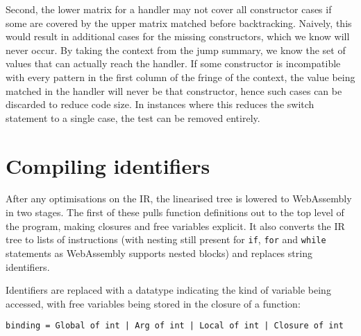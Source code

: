 Second, the lower matrix for a handler may not cover all constructor cases if some are covered by the upper matrix matched before backtracking. Naively, this would result in additional cases for the missing constructors, which we know will never occur. 
By taking the context from the jump summary, we know the set of values that can actually reach the handler. If some constructor is incompatible with every pattern in the first column of the fringe of the context, the value being matched in the handler will never be that constructor, hence such cases can be discarded to reduce code size. In instances where this reduces the switch statement to a single case, the test can be removed entirely.




\section{Compiling identifiers}
After any optimisations on the IR, the linearised tree is lowered to WebAssembly in two stages. The first of these pulls function definitions out to the top level of the program, making closures and free variables explicit. It also converts the IR tree to lists of instructions (with nesting still present for \verb|if|, \verb|for| and \verb|while| statements as WebAssembly supports nested blocks) and replaces string identifiers.


Identifiers are replaced with a datatype indicating the kind of variable being accessed, with free variables being stored in the closure of a function:

\verb"binding = Global of int | Arg of int | Local of int | Closure of int"


